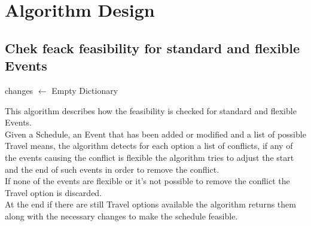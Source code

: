 \section{Algorithm Design}

\subsection{Chek feack feasibility for standard and flexible Events}

\begin{algorithm}[H]

	\bigskip
	changes $\gets$ Empty Dictionary\\{
{}
}
\end{algorithm}
\bigskip
\noindent
This algorithm describes how the feasibility is checked for standard and flexible Events.\\
Given a  Schedule, an Event that has been added or modified and a list of possible Travel means, the algorithm detects for each option a list of conflicts, if any of the events causing the conflict is flexible the algorithm tries to adjust the start and the end of such events in order to remove the conflict.\\
If none of the events are flexible or it's not possible to remove the conflict the Travel option is discarded.\\
At the end if there are still Travel options available the algorithm returns them along with the necessary changes to make the schedule feasible.

